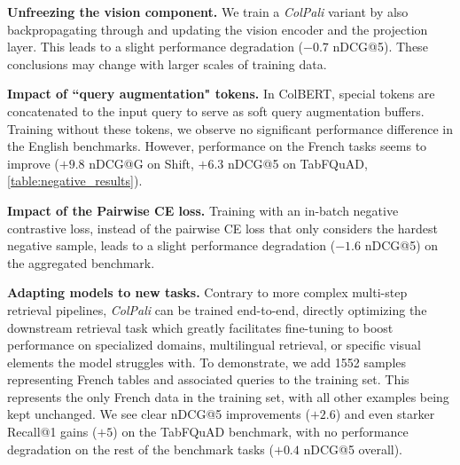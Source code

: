 \documentclass{article} %
\begin{document}
\noindent\textbf{Unfreezing the vision component.} We train a \textit{ColPali} variant by also backpropagating through and updating the vision encoder and the projection layer. This leads to a slight performance degradation ($-0.7$ nDCG@5). These conclusions may change with larger scales of training data.

\noindent\textbf{Impact of ``query augmentation" tokens.} In ColBERT, special tokens are concatenated to the input query to serve as soft query augmentation buffers. Training without these tokens, we observe no significant performance difference in the English benchmarks. However, performance on the French tasks seems to improve ($+9.8$ nDCG@G on Shift, $+6.3$ nDCG@5 on TabFQuAD, \autoref{table:negative_results}).


\noindent\textbf{Impact of the Pairwise CE loss.} Training with an in-batch negative contrastive loss, instead of the pairwise CE loss that only considers the hardest negative sample, leads to a slight performance degradation ($-1.6$ nDCG@5) on the aggregated benchmark.

\noindent\textbf{Adapting models to new tasks.} Contrary to more complex multi-step retrieval pipelines, \textit{ColPali} can be trained end-to-end, directly optimizing the downstream retrieval task which greatly facilitates fine-tuning to boost performance on specialized domains, multilingual retrieval, or specific visual elements the model struggles with. To demonstrate, we add 1552 samples representing French tables and associated queries to the training set. This represents the only French data in the training set, with all other examples being kept unchanged. We see clear nDCG@5 improvements ($+2.6$) and even starker Recall@1 gains ($+5$) on the TabFQuAD benchmark, with no performance degradation on the rest of the benchmark tasks ($+0.4$ nDCG@5 overall).
\end{document}
